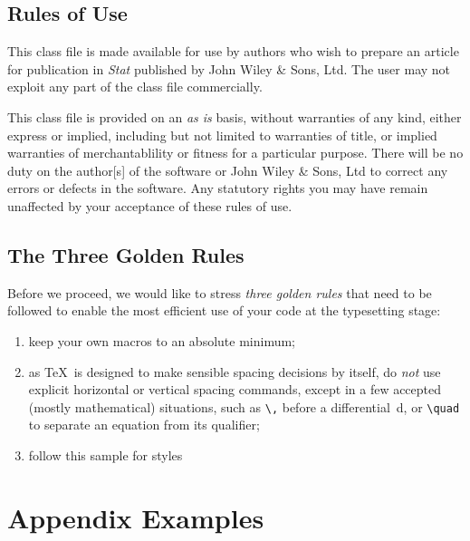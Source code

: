 \documentclass[cmbright]{WileySTAT-V1} %
\theoremstyle{plain}
\begin{document}
\subsection{Rules of Use}

This class file is made available for use by authors who wish to prepare an article for publication in \textit{Stat} published by John Wiley \& Sons, Ltd. The user may not exploit any part of the class file commercially.

This class file is provided on an \emph{as is} basis, without warranties of any kind, either express or implied, including but not limited to warranties of title, or implied warranties of merchantablility or fitness for a particular purpose. There will be no duty on the author[s] of the software or John Wiley \& Sons, Ltd to correct any errors or defects in the software. Any statutory rights you may have remain unaffected by your acceptance of these rules of use.

\subsection{The Three Golden Rules}

Before we proceed, we would like to stress \emph{three golden rules} that need to be followed to enable the most efficient use of your code at the typesetting stage:
\begin{enumerate}
\item[(i)] keep your own macros to an absolute minimum;

\item[(ii)] as \TeX\ is designed to make sensible spacing decisions by itself, do \emph{not} use explicit horizontal or vertical spacing commands, except in a few accepted (mostly mathematical) situations, such as \verb"\," before a differential~d, or \verb"\quad" to separate an equation from its qualifier;

\item[(iii)] follow this sample for styles
\end{enumerate}




\appendix

\section{Appendix Examples}\label{appsec1}
\end{document}
